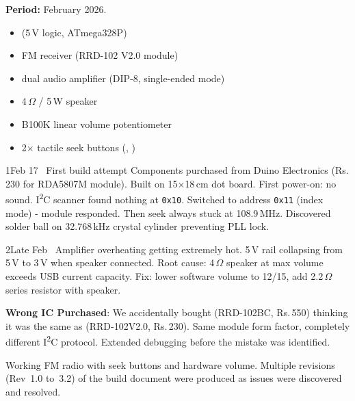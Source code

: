 \textbf{Period:} February 2026.

\medskip\noindent
{}

\begin{itemize}[nosep]
    \item {} (5\,V logic, ATmega328P)
    \item {} FM receiver (\textsc{RRD-102 V2.0} module)
    \item {} dual audio amplifier (DIP-8, single-ended mode)
    \item 4\,$\Omega$ / 5\,W speaker
    \item B100K linear volume potentiometer
    \item 2$\times$ tactile seek buttons (, )
\end{itemize}

\begin{logentry}{1}{Feb 17 \textbullet\ First build attempt}
Components purchased from Duino Electronics (Rs.\,230 for RDA5807M module).
Built on 15$\times$18\,cm dot board.  First power-on: no sound.  I\textsuperscript{2}C
scanner found nothing at \texttt{0x10}.  Switched to address \texttt{0x11}
(index mode) - module responded.  Then seek always stuck at 108.9\,MHz.
Discovered solder ball on 32.768\,kHz crystal cylinder preventing PLL lock.
\end{logentry}

\begin{logentry}{2}{Late Feb \textbullet\ Amplifier overheating}
 getting extremely hot.  5\,V rail collapsing from 5\,V to
3\,V when speaker connected.  Root cause: 4\,$\Omega$ speaker at max volume
exceeds USB current capacity.  Fix: lower software volume to 12/15, add
2.2\,$\Omega$ series resistor with speaker.
\end{logentry}

\begin{calloutwarn}
\textbf{Wrong IC Purchased}: We accidentally bought 
(\textsc{RRD-102BC}, Rs.\,550) thinking it was the same as 
(\textsc{RRD-102V2.0}, Rs.\,230).  Same module form factor, completely
different I\textsuperscript{2}C protocol.  Extended debugging before the
mistake was identified.
\end{calloutwarn}

\medskip\noindent
{}

Working FM radio with seek buttons and hardware volume.  Multiple revisions
(Rev~1.0 to~3.2) of the build document were produced as issues were
discovered and resolved.


